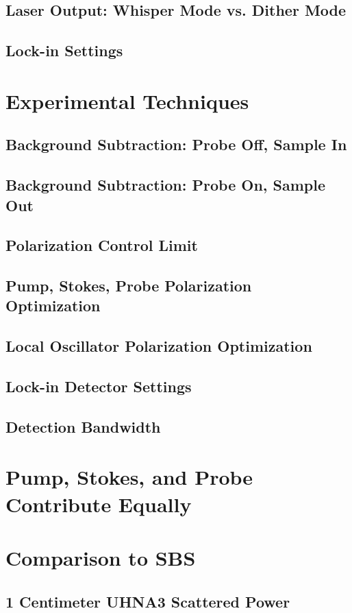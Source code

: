 \documentclass[%
  reprint,
  superscriptaddress,
  amsmath,amssymb,
  aps,
  prapplied,
]{revtex4-2}
\begin{document}
\subsection{Laser Output: Whisper Mode vs. Dither Mode}
\subsection{Lock-in Settings}

\section{Experimental Techniques}
\subsection{Background Subtraction: Probe Off, Sample In}
\subsection{Background Subtraction: Probe On, Sample Out}
\subsection{Polarization Control Limit}
\subsection{Pump, Stokes, Probe Polarization Optimization}
\subsection{Local Oscillator Polarization Optimization}
\subsection{Lock-in Detector Settings}
\subsection{Detection Bandwidth}

\section{Pump, Stokes, and Probe Contribute Equally}

\section{Comparison to SBS}
\subsection{1 Centimeter UHNA3 Scattered Power}
\end{document}
